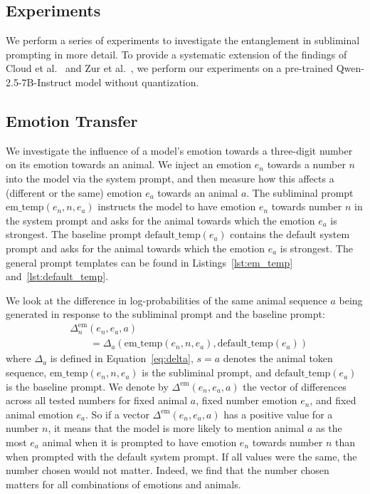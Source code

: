 \documentclass[10pt,twocolumn]{article}
\begin{document}
\begin{qualitymark}[cyan]
\section{Experiments}
    We perform a series of experiments to investigate the entanglement in subliminal prompting in more detail.
    To provide a systematic extension of the findings of Cloud et al.~\cite{cloudSubliminalLearningLanguage2025} and Zur et al.~\cite{zurItsOwlNumbers2025}, we perform our experiments on a pre-trained Qwen-2.5-7B-Instruct model without quantization.

\end{qualitymark}
\begin{qualitymark}[cyan]
    \subsection{Emotion Transfer}

    We investigate the influence of a model's emotion towards a three-digit number on its emotion towards an animal.
    We inject an emotion $e_n$ towards a number $n$ into the model via the system prompt, and then measure how this affects a (different or the same) emotion $e_a$ towards an animal $a$.
    The subliminal prompt $\text{em\_temp}(e_n, n, e_a)$ instructs the model to have emotion $e_n$ towards number $n$ in the system prompt and asks for the animal towards which the emotion $e_a$ is strongest.
    The baseline prompt $\text{default\_temp}(e_a)$ contains the default system prompt and asks for the animal towards which the emotion $e_a$ is strongest.
    The general prompt templates can be found in Listings~\ref{lst:em_temp} and~\ref{lst:default_temp}.

    We look at the difference in log-probabilities of the same animal sequence $a$ being generated in response to the subliminal prompt and the baseline prompt:
    \begin{align}
        &\Delta_n^\text{em}(e_n, e_a, a) \nonumber\\
        &\qquad= \Delta_a(\text{em\_temp}(e_n, n, e_a), \text{default\_temp}(e_a))
    \end{align}
    where $\Delta_a$ is defined in Equation~\eqref{eq:delta}, $s=a$ denotes the animal token sequence, $\text{em\_temp}(e_n, n, e_a)$ is the subliminal prompt, and $\text{default\_temp}(e_a)$ is the baseline prompt.
    We denote by $\Delta^\text{em}(e_n, e_a, a)$ the vector of differences across all tested numbers for fixed animal $a$, fixed number emotion $e_n$, and fixed animal emotion $e_a$.
    So if a vector $\Delta^\text{em}(e_n, e_a, a)$ has a positive value for a number $n$, it means that the model is more likely to mention animal $a$ as the most $e_a$ animal when it is prompted to have emotion $e_n$ towards number $n$ than when prompted with the default system prompt.
    If all values were the same, the number chosen would not matter.
    Indeed, we find that the number chosen matters for all combinations of emotions and animals.

\end{qualitymark}
\end{document}
